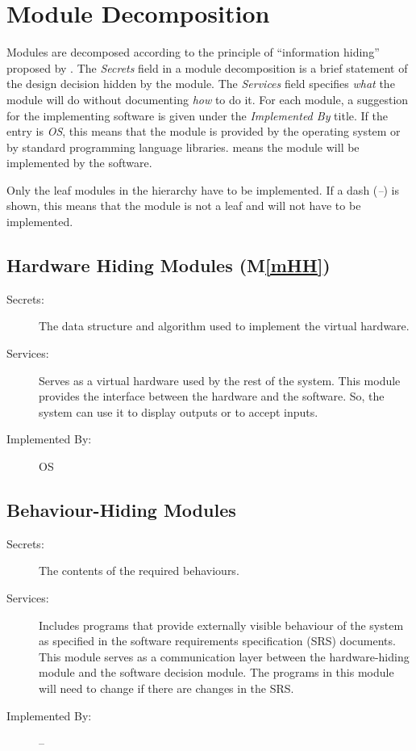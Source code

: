 \documentclass[12pt, titlepage]{article}
\newcommand{\mref}[1]{M\ref{#1}}
\begin{document}
\section{Module Decomposition} \label{SecMD}

Modules are decomposed according to the principle of ``information hiding''
proposed by \citet{ParnasEtAl1984}. The \emph{Secrets} field in a module
decomposition is a brief statement of the design decision hidden by the
module. The \emph{Services} field specifies \emph{what} the module will do
without documenting \emph{how} to do it. For each module, a suggestion for the
implementing software is given under the \emph{Implemented By} title. If the
entry is \emph{OS}, this means that the module is provided by the operating
system or by standard programming language libraries.  \emph{\progname{}} means the
module will be implemented by the \progname{} software.

Only the leaf modules in the hierarchy have to be implemented. If a dash
(\emph{--}) is shown, this means that the module is not a leaf and will not have
to be implemented.

\subsection{Hardware Hiding Modules (\mref{mHH})}

\begin{description}
\item[Secrets:]The data structure and algorithm used to implement the virtual
  hardware.
\item[Services:]Serves as a virtual hardware used by the rest of the
  system. This module provides the interface between the hardware and the
  software. So, the system can use it to display outputs or to accept inputs.
\item[Implemented By:] OS
\end{description}

\subsection{Behaviour-Hiding Modules}

\begin{description}
\item[Secrets:]The contents of the required behaviours.
\item[Services:]Includes programs that provide externally visible behaviour of
  the system as specified in the software requirements specification (SRS)
  documents. This module serves as a communication layer between the
  hardware-hiding module and the software decision module. The programs in this
  module will need to change if there are changes in the SRS.
\item[Implemented By:] --
\end{description}
\end{document}
